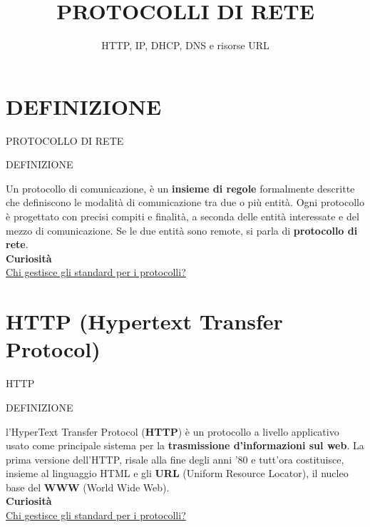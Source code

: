 \documentclass[aspectratio=1610]{beamer}
\title{PROTOCOLLI DI RETE}
\subtitle{HTTP, IP, DHCP, DNS e risorse URL}
\date{}
\institute{\textit{
        Fonti:
        \begin{itemize}
            \item[-] \href{https://it.wikipedia.org/wiki/Protocollo_di_rete}{Wikipedia}
            \item[-] \href{https://www.forbes.com/advisor/it/business/software/ipv6-protocollo-vpn/}{Forbes}
            \item[-] \href{https://www.fastweb.it/fastweb-plus/digital-magazine/cose-url/}{Fastweb Plus} 
        \end{itemize}
    }
}
\begin{document}
\begin{frame}
    \titlepage
\end{frame}

\section{DEFINIZIONE}

\begin{frame}{PROTOCOLLO DI RETE}
    \begin{alertblock}{DEFINIZIONE}
        \begin{minipage}{0.98\linewidth}
            \justifying
            Un protocollo di comunicazione, è un \textbf{insieme di regole} formalmente descritte 
            che definiscono le modalità di comunicazione tra due o più entità. Ogni protocollo 
            è progettato con precisi compiti e finalità, a seconda delle entità interessate e 
            del mezzo di comunicazione. Se le due entità sono remote, si parla di \textbf{protocollo di rete}.\\
            \bigskip
            \tiny{\textbf{Curiosità}}\\
            \tiny{\href{https://www.w3.org/}{Chi gestisce gli standard per i protocolli?}}           
        \end{minipage}
    \end{alertblock}
\end{frame}

\section{HTTP (Hypertext Transfer Protocol)}

\begin{frame}{HTTP}
    \begin{alertblock}{DEFINIZIONE}
        \begin{minipage}{0.98\linewidth}
            \justifying
            l'HyperText Transfer Protocol (\textbf{HTTP}) è un protocollo a livello applicativo 
            usato come principale sistema per la \textbf{trasmissione d'informazioni sul web}. La prima 
            versione dell'HTTP, risale alla fine degli anni '80 e tutt'ora costituisce, insieme al 
            linguaggio HTML e gli \textbf{URL} (Uniform Resource Locator), il nucleo base 
            del \textbf{WWW} (World Wide Web).\\
            \bigskip
            \tiny{\textbf{Curiosità}}\\
            \tiny{\href{https://www.w3.org/}{Chi gestisce gli standard per i protocolli?}}           
        \end{minipage}
    \end{alertblock}
\end{frame}
\end{document}
